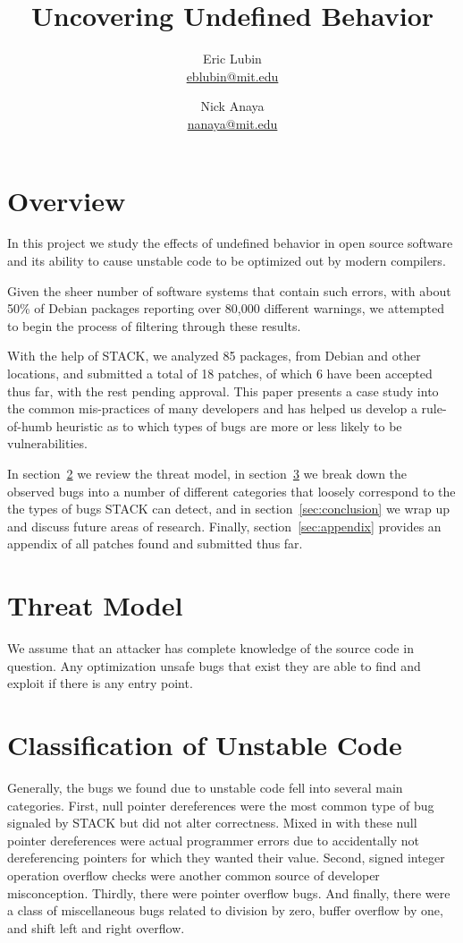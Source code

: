 \documentclass[9pt,twocolumn]{article}
\title{Uncovering Undefined Behavior}
\author{
    Eric Lubin\\
    \href{mailto:eblubin@mit.edu}{eblubin@mit.edu}
\and
    Nick Anaya\\
    \href{mailto:nanaya@mit.edu}{nanaya@mit.edu}
}
\newcommand{\NumPackages}{85 }
\newcommand{\NumPatches}{18 }
\newcommand{\NumPatchesAccepted}{6 }
\begin{document}
\maketitle

\section{Overview}
In this project we study the effects of undefined behavior in open source software
and its ability to cause unstable code to be optimized out by modern compilers.

Given the sheer number of software systems that contain such errors, 
with about 50\% of Debian packages reporting over 80,000 different warnings,
we attempted to begin the process of filtering through these results. 

With the help of STACK\cite{stack}, we analyzed \NumPackages packages, 
from Debian and other locations, and submitted a total of \NumPatches patches, 
of which \NumPatchesAccepted have been accepted thus far, with the rest pending approval.
This paper presents a case study into the common mis-practices of many developers and
has helped us develop a rule-of-humb heuristic as to which types of bugs are more
or less likely to be vulnerabilities.

In section~\ref{sec:threat} we review the threat model, in section~\ref{sec:classification}
we break down the observed bugs into a number of different categories that loosely 
correspond to the the types of bugs STACK can detect, and in section~\ref{sec:conclusion}
we wrap up and discuss future areas of research. Finally, section~\ref{sec:appendix} provides an 
appendix of all patches found and submitted thus far.

\section{Threat Model}
\label{sec:threat}
We assume that an attacker has complete knowledge of the source code in question. Any 
optimization unsafe bugs that exist they are able to find and exploit if there is any entry point.

\section{Classification of Unstable Code}
\label{sec:classification}
Generally, the bugs we found due to unstable code fell into several
main categories. First, null pointer dereferences were the  most common type of 
bug signaled by STACK but did not alter correctness. Mixed in with these null pointer dereferences
were actual programmer errors due to accidentally not dereferencing pointers for which
they wanted their value. Second, signed integer operation overflow checks were another common source
of developer misconception. Thirdly, there were pointer overflow bugs. And finally, there were a class
of miscellaneous bugs related to division by zero, buffer overflow by one, and shift left and right overflow.
\end{document}
